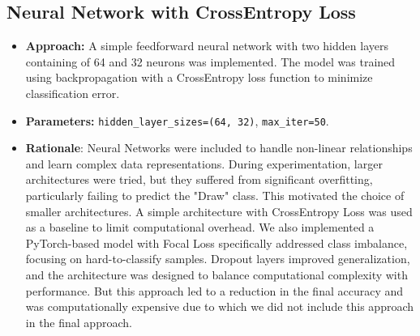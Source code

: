 \documentclass{article}
\begin{document}
\subsection{Neural Network with CrossEntropy Loss}
\begin{itemize}
    \item \textbf{Approach:} A simple feedforward neural network with two hidden layers containing of 64 and 32 neurons was implemented. The model was trained using backpropagation with a CrossEntropy loss function to minimize classification error.
    \item \textbf{Parameters:} \texttt{hidden\_layer\_sizes=(64, 32)}, \texttt{max\_iter=50}.
    \item \textbf{Rationale}: Neural Networks were included to handle non-linear relationships and learn complex data representations. During experimentation, larger architectures were tried, but they suffered from significant overfitting, particularly failing to predict the "Draw" class. This motivated the choice of smaller architectures. A simple architecture with CrossEntropy Loss was used as a baseline to limit computational overhead. We also implemented a PyTorch-based model with Focal Loss specifically addressed class imbalance, focusing on hard-to-classify samples. Dropout layers improved generalization, and the architecture was designed to balance computational complexity with performance. But this approach led to a reduction in the final accuracy and was computationally expensive due to which we did not include this approach in the final approach. 
\end{itemize}
\end{document}
